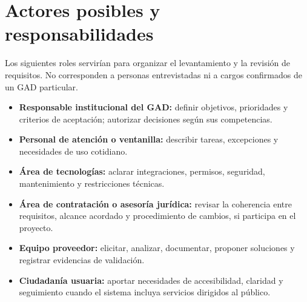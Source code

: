 \documentclass[10pt,a4paper,onecolumn]{IEEEtran}
\begin{document}
\section{Actores posibles y responsabilidades}
Los siguientes roles servirían para organizar el levantamiento y la revisión de requisitos. No corresponden a personas entrevistadas ni a cargos confirmados de un GAD particular.
\begin{itemize}
\item \textbf{Responsable institucional del GAD:} definir objetivos, prioridades y criterios de aceptación; autorizar decisiones según sus competencias.
\item \textbf{Personal de atención o ventanilla:} describir tareas, excepciones y necesidades de uso cotidiano.
\item \textbf{Área de tecnologías:} aclarar integraciones, permisos, seguridad, mantenimiento y restricciones técnicas.
\item \textbf{Área de contratación o asesoría jurídica:} revisar la coherencia entre requisitos, alcance acordado y procedimiento de cambios, si participa en el proyecto.
\item \textbf{Equipo proveedor:} elicitar, analizar, documentar, proponer soluciones y registrar evidencias de validación.
\item \textbf{Ciudadanía usuaria:} aportar necesidades de accesibilidad, claridad y seguimiento cuando el sistema incluya servicios dirigidos al público.
\end{itemize}
\end{document}
